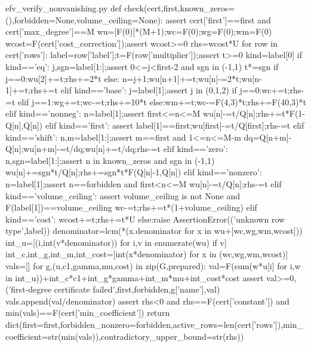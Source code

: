 \documentclass[12pt,a4paper]{article}
\numberwithin{equation}{section}
\theoremstyle{definition}
\begin{document}
\begin{filecontents*}[overwrite]{efv_verify_nonvanishing.py}
    def check(cert,first,known_zeros=(),forbidden=None,volume_ceiling=None):
        assert cert['first']==first and cert['max_degree']==M
        wu=[F(0)]*(M+1);wc=F(0);wg=F(0);wm=F(0)
        wcost=F(cert['cost_correction']);assert wcost>=0
        rhs=wcost*U
        for row in cert['rows']:
            label=row['label'];t=F(row['multiplier']);assert t>=0
            kind=label[0]
            if kind=='eq':
                j,sgn=label[1:];assert 0<=j<first-2 and sgn in (-1,1)
                t*=sgn
                if j==0:wu[2]+=t;rhs+=2*t
                else:
                    n=j+1;wu[n+1]+=t;wu[n]-=2*t;wu[n-1]+=t;rhs+=t
            elif kind=='base':
                j=label[1];assert j in (0,1,2)
                if j==0:wc+=t;rhs-=t
                elif j==1:wg+=t;wc-=t;rhs+=10*t
                else:wm+=t;wc-=F(4,3)*t;rhs+=F(40,3)*t
            elif kind=='nonneg':
                n=label[1];assert first<=n<=M
                wu[n]-=t/Q[n];rhs+=t*F(1-Q[n],Q[n])
            elif kind=='first':
                assert label[1]==first;wu[first]-=t/Q[first];rhs-=t
            elif kind=='shift':
                n,m=label[1:];assert m==first and 1<=n<=M-m
                dq=Q[n+m]-Q[n];wu[n+m]-=t/dq;wu[n]+=t/dq;rhs-=t
            elif kind=='zero':
                n,sgn=label[1:];assert n in known_zeros and sgn in (-1,1)
                wu[n]+=sgn*t/Q[n];rhs+=sgn*t*F(Q[n]-1,Q[n])
            elif kind=='nonzero':
                n=label[1];assert n==forbidden and first<n<=M
                wu[n]-=t/Q[n];rhs-=t
            elif kind=='volume_ceiling':
                assert volume_ceiling is not None and F(label[1])==volume_ceiling
                wc-=t;rhs+=t*(1+volume_ceiling)
            elif kind=='cost':
                wcost+=t;rhs+=t*U
            else:raise AssertionError(('unknown row type',label))
        denominator=lcm(*(x.denominator for x in wu+[wc,wg,wm,wcost]))
        int_u=[(i,int(v*denominator)) for i,v in enumerate(wu) if v]
        int_c,int_g,int_m,int_cost=[int(x*denominator) for x in (wc,wg,wm,wcost)]
        vals=[]
        for g,(u,c1,gamma,mu,cost) in zip(G,prepared):
            val=F(sum(w*u[i] for i,w in int_u))+int_c*c1+int_g*gamma+int_m*mu+int_cost*cost
            assert val>=0,('first-degree certificate failed',first,forbidden,g['name'],val)
            vals.append(val/denominator)
        assert rhs<0 and rhs==F(cert['constant']) and min(vals)==F(cert['min_coefficient'])
        return dict(first=first,forbidden_nonzero=forbidden,active_rows=len(cert['rows']),min_coefficient=str(min(vals)),contradictory_upper_bound=str(rhs))


\end{filecontents*}
\end{document}
